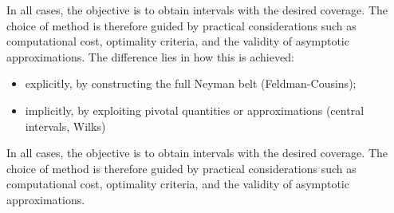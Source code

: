 In all cases, the objective is to obtain intervals with the desired coverage. The choice of method is therefore guided by practical considerations such as computational cost, optimality criteria, and the validity of asymptotic approximations.
The difference lies in how this is achieved:
\begin{itemize}
	\item explicitly, by constructing the full Neyman belt (Feldman-Cousins);
	\item implicitly, by exploiting pivotal quantities or approximations (central intervals, Wilks)
\end{itemize}

In all cases, the objective is to obtain intervals with the desired coverage. The choice of method is therefore guided by practical considerations such as computational cost, optimality criteria, and the validity of asymptotic approximations.
